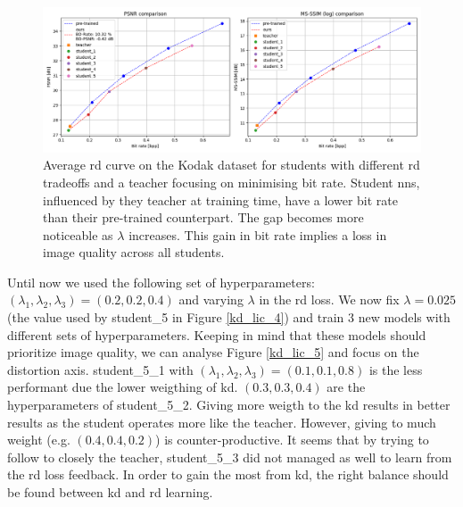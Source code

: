 \documentclass{article}
\begin{document}
\begin{figure}
    \centering
    \includegraphics[width=15cm]{kd_lic_rd_lambda_2.png}
    \caption[Average \acrshort{rd} curve on the Kodak dataset for students with different \acrshort{rd} tradeoffs and a teacher focusing on minimising bit rate.]{Average \acrshort{rd} curve on the Kodak dataset for students with different \acrshort{rd} tradeoffs and a teacher focusing on minimising bit rate. Student \acrshort{nn}s, influenced by they teacher at training time, have a lower bit rate than their pre-trained counterpart. The gap becomes more noticeable as \(\lambda\) increases. This gain in bit rate implies a loss in image quality across all students.}
    \label{kd_lic_4_bis}
\end{figure}

Until now we used the following set of hyperparameters: \((\lambda_{1}, \lambda_{2}, \lambda_{3}) = (0.2, 0.2, 0.4)\) and varying \(\lambda\) in the \acrshort{rd} loss. We now fix \(\lambda = 0.025\) (the value used by \textsf{student\_5} in Figure \ref{kd_lic_4}) and train 3 new models with different sets of hyperparameters. Keeping in mind that these models should prioritize image quality, we can analyse Figure \ref{kd_lic_5} and focus on the distortion axis. \textsf{student\_5\_1} with \((\lambda_{1}, \lambda_{2}, \lambda_{3}) = (0.1, 0.1, 0.8)\) is the less performant due the lower weigthing of \acrshort{kd}. \((0.3, 0.3, 0.4)\) are the hyperparameters of \textsf{student\_5\_2}. Giving more weigth to the \acrshort{kd} results in better results as the student operates more like the teacher. However, giving to much weight (e.g. \((0.4, 0.4, 0.2)\)) is counter-productive. It seems that by trying to follow to closely the teacher, \textsf{student\_5\_3} did not managed as well to learn from the \acrshort{rd} loss feedback. In order to gain the most from \acrshort{kd}, the right balance should be found between \acrshort{kd} and \acrshort{rd} learning.
\end{document}
